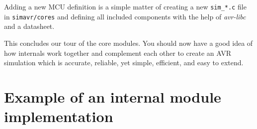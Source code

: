 Adding a new \ac{MCU} definition is a simple matter of creating a new \verb|sim_*.c|
file in \verb|simavr/cores| and defining all included components with the help
of \emph{avr-libc} and a datasheet.

This concludes our tour of the \simavr core modules. You should now have a
good idea of how \simavr internals work together and complement each
other to create an \ac{AVR} simulation which is accurate, reliable, yet simple,
efficient, and easy to extend.


\section{Example of an internal module implementation} %

